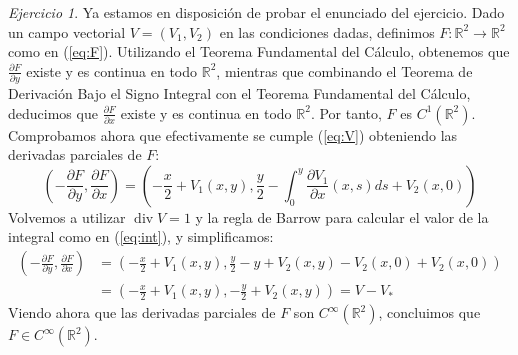 \documentclass[12pt,spanish]{article}
\theoremstyle{definition}
\theoremstyle{remark}
\newtheorem{exercise}{Ejercicio}
\begin{document}
\begin{exercise}
Ya estamos en disposición de probar el enunciado del ejercicio. Dado
un campo vectorial $V=(V_1,V_2)$ en las condiciones dadas, definimos
$F:\mathbb{R}^2\rightarrow\mathbb{R}^2$ como en
(\ref{eq:F}). Utilizando el Teorema Fundamental del Cálculo,
obtenemos que $\frac{\partial F}{\partial y}$ existe y es continua en
todo $\mathbb{R}^2$, mientras que combinando el Teorema de Derivación
Bajo el Signo Integral con el Teorema Fundamental del Cálculo,
deducimos que $\frac{\partial F}{\partial x}$ existe y es continua en
todo $\mathbb{R}^2$. Por tanto, $F$ es
$C^1(\mathbb{R}^2)$. Comprobamos ahora que efectivamente se cumple
(\ref{eq:V}) obteniendo las derivadas parciales de $F$:
\begin{equation*}
  \left(-\frac{\partial F}{\partial y},\frac{\partial F}{\partial x}\right)=\left(-\frac{x}{2}+V_1(x,y),\frac{y}{2}-\int_0^y \frac{\partial V_1}{\partial x}(x,s)ds+V_2(x,0)\right)
\end{equation*}
Volvemos a utilizar $\operatorname{div}V=1$ y la regla de Barrow para
calcular el valor de la integral como en (\ref{eq:int}), y
simplificamos:
\begin{align*}
  \left(-\frac{\partial F}{\partial y},\frac{\partial F}{\partial x}\right)&=\left(-\frac{x}{2}+V_1(x,y),\frac{y}{2}-y+V_2(x,y)-V_2(x,0)+V_2(x,0)\right) \\
  &=\left(-\frac{x}{2}+V_1(x,y),-\frac{y}{2}+V_2(x,y)\right)=V-V_*
\end{align*}
Viendo ahora que las derivadas parciales de $F$ son
$C^\infty(\mathbb{R}^2)$, concluimos que $F\in C^\infty(\mathbb{R}^2)$.
\end{exercise}
\end{document}
